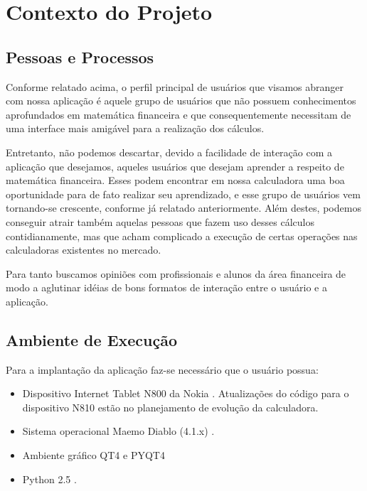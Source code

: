 \section{Contexto do Projeto}

\subsection{Pessoas e Processos}

Conforme relatado acima, o perfil principal de usuários que visamos abranger com nossa aplicação é aquele grupo de usuários que não possuem conhecimentos aprofundados em matemática financeira e que consequentemente necessitam de uma interface mais amigável para a realização dos cálculos.

Entretanto, não podemos descartar, devido a facilidade de interação com a aplicação que desejamos, aqueles usuários que desejam aprender a respeito de matemática financeira. Esses podem encontrar em nossa calculadora uma boa oportunidade para de fato realizar seu aprendizado, e esse grupo de usuários vem tornando-se crescente, conforme já relatado anteriormente. Além destes, podemos conseguir atrair também aquelas pessoas que fazem uso desses cálculos contidianamente, mas que acham complicado a execução de certas operações nas calculadoras existentes no mercado.

Para tanto buscamos opiniões com profissionais e alunos da área financeira de modo a aglutinar idéias de bons formatos de interação entre o usuário e a aplicação.


\subsection{Ambiente de Execução}


Para a implantação da aplicação faz-se necessário que o usuário possua:

\begin{itemize}
 \item Dispositivo Internet Tablet N800 da Nokia \cite{n800}. Atualizações do código para o dispositivo N810 estão no planejamento de evolução da calculadora.
 \item Sistema operacional Maemo Diablo (4.1.x) \cite{diablo}.
 \item Ambiente gráfico QT4 \cite{qt4} e PYQT4 \cite{pyqt4}
 \item Python 2.5 \cite{python}.
\end{itemize}

